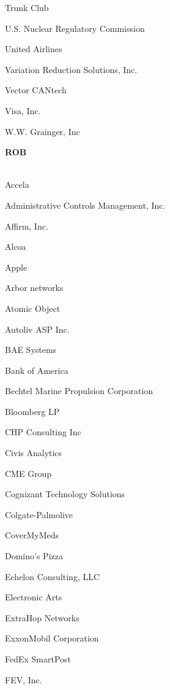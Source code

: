 \documentclass[twoside]{article}
\begin{document}
\begin{center}
\begin{multicols}{5}
\begin{FlushLeft}
\begin{compactitem}
\item Trunk Club
\item U.S. Nuclear Regulatory Commission
\item United Airlines
\item Variation Reduction Solutions, Inc.
\item Vector CANtech
\item Visa, Inc.
\item W.W. Grainger, Inc
\end{compactitem}
        \end{FlushLeft}
        \vspace{1em}
        {\fontsize{14}{16}\selectfont \bf ROB}\\
        \vspace{-1em}
        ~\hrulefill~
        \vspace{-.9em}
        \begin{FlushLeft}
        \begin{compactitem}
        \item Accela
\item Administrative Controls Management, Inc.
\item Affirm, Inc.
\item Alcoa
\item Apple
\item Arbor networks
\item Atomic Object
\item Autoliv ASP Inc.
\item BAE Systems
\item Bank of America
\item Bechtel Marine Propulsion Corporation
\item Bloomberg LP
\item CHP Consulting Inc
\item Civis Analytics
\item CME Group
\item Cognizant Technology Solutions
\item Colgate-Palmolive
\item CoverMyMeds
\item Domino's Pizza
\item Echelon Consulting, LLC
\item Electronic Arts
\item ExtraHop Networks
\item ExxonMobil Corporation
\item FedEx SmartPost
\item FEV, Inc.

\end{compactitem}
\end{FlushLeft}
\end{multicols}
\end{center}
\end{document}
